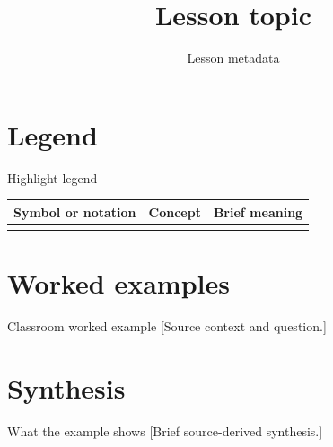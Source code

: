 \documentclass[12pt,aspectratio=169]{beamer}
\title{Lesson topic}
\subtitle{Lesson metadata}
\author{}
\date{}
\makeatletter
\newcommand{\GEConciseHighlightLegend}{%
  \begingroup\small
  \begin{tabularx}{\linewidth}{@{}>{\raggedright\arraybackslash}p{.30\linewidth}
    >{\raggedright\arraybackslash}p{.25\linewidth}
    >{\raggedright\arraybackslash}X@{}}
    \toprule
    \textbf{Symbol or notation} & \textbf{Concept} & \textbf{Brief meaning}\\
    \midrule
    [Registered notation] & [Registered concept] & [Registered meaning]\\
    \bottomrule
  \end{tabularx}\par\endgroup
}
\makeatother
\begin{document}
\section{Legend}
\begin{frame}
  \titlepage
\end{frame}
\begin{frame}[t]{Highlight legend}
  \GEConciseHighlightLegend
\end{frame}
\section{Worked examples}
\begin{frame}[t]{Classroom worked example}
  [Source context and question.]
\end{frame}
\section{Synthesis}
\begin{frame}[t]{What the example shows}
  [Brief source-derived synthesis.]
\end{frame}
\end{document}
